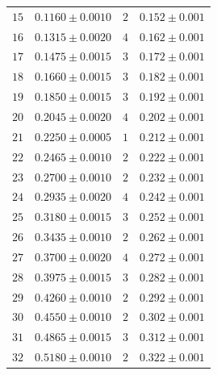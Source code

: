 \documentclass[12pt, a4paper]{article}
\begin{document}
\begin{table}[!h]
{\begin{tabular}{|c|c|c|c|}
\footnotesize$15$ & \footnotesize$0.1160 \pm 0.0010$ & \footnotesize$2$ & \footnotesize$0.152\pm 0.001$\\
\footnotesize$16$ & \footnotesize$0.1315 \pm 0.0020$ & \footnotesize$4$ & \footnotesize$0.162\pm 0.001$\\
\footnotesize$17$ & \footnotesize$0.1475 \pm 0.0015$ & \footnotesize$3$ & \footnotesize$0.172\pm 0.001$\\
\footnotesize$18$ & \footnotesize$0.1660 \pm 0.0015$ & \footnotesize$3$ & \footnotesize$0.182\pm 0.001$\\
\footnotesize$19$ & \footnotesize$0.1850 \pm 0.0015$ & \footnotesize$3$ & \footnotesize$0.192\pm 0.001$\\
\footnotesize$20$ & \footnotesize$0.2045 \pm 0.0020$ & \footnotesize$4$ & \footnotesize$0.202\pm 0.001$\\ 
\footnotesize$21$ & \footnotesize$0.2250 \pm 0.0005$ & \footnotesize$1$ & \footnotesize$0.212\pm 0.001$\\
\footnotesize$22$ & \footnotesize$0.2465 \pm 0.0010$ & \footnotesize$2$ & \footnotesize$0.222\pm 0.001$\\
\footnotesize$23$ & \footnotesize$0.2700 \pm 0.0010$ & \footnotesize$2$ & \footnotesize$0.232\pm 0.001$\\
\footnotesize$24$ & \footnotesize$0.2935 \pm 0.0020$ & \footnotesize$4$ & \footnotesize$0.242\pm 0.001$\\
\footnotesize$25$ & \footnotesize$0.3180 \pm 0.0015$ & \footnotesize$3$ & \footnotesize$0.252\pm 0.001$\\ 
\footnotesize$26$ & \footnotesize$0.3435 \pm 0.0010$ & \footnotesize$2$ & \footnotesize$0.262\pm 0.001$\\
\footnotesize$27$ & \footnotesize$0.3700 \pm 0.0020$ & \footnotesize$4$ & \footnotesize$0.272\pm 0.001$\\
\footnotesize$28$ & \footnotesize$0.3975 \pm 0.0015$ & \footnotesize$3$ & \footnotesize$0.282\pm 0.001$\\
\footnotesize$29$ & \footnotesize$0.4260 \pm 0.0010$ & \footnotesize$2$ & \footnotesize$0.292\pm 0.001$\\
\footnotesize$30$ & \footnotesize$0.4550 \pm 0.0010$ & \footnotesize$2$ & \footnotesize$0.302\pm 0.001$\\
\footnotesize$31$ & \footnotesize$0.4865 \pm 0.0015$ & \footnotesize$3$ & \footnotesize$0.312\pm 0.001$\\
\footnotesize$32$ & \footnotesize$0.5180 \pm 0.0010$ & \footnotesize$2$ & \footnotesize$0.322\pm 0.001$\\

\end{tabular}}
\end{table}
\end{document}
